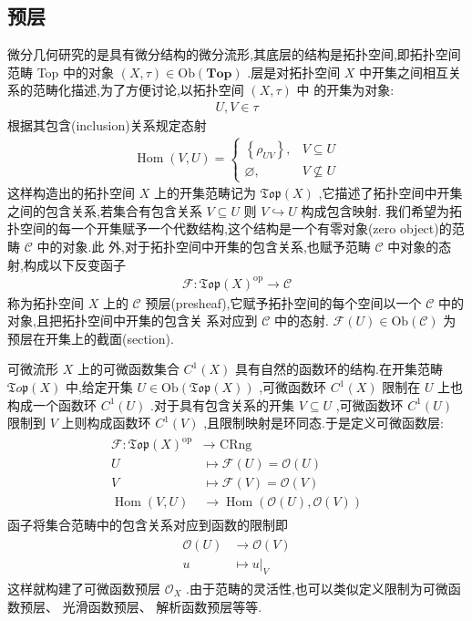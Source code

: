 \subsection{预层}
微分几何研究的是具有微分结构的微分流形,其底层的结构是拓扑空间,即拓扑空间范畴 Top 中的对象 $(X, \tau) \in \mathrm{Ob}(\mathbf{T o p})$ .层是对拓扑空间 $X$ 中开集之间相互关系的范畴化描述,为了方便讨论,以拓扑空间 $(X, \tau)$ 中 的开集为对象:
\begin{align*}
U, V \in \tau
\end{align*}
根据其包含(inclusion)关系规定态射
\begin{align*}
\operatorname{Hom}(V, U)= \begin{cases}\left\{\rho_{U V}\right\}, & V \subseteq U \\ \varnothing, & V \nsubseteq U\end{cases}
\end{align*}
这样构造出的拓扑空间 $X$ 上的开集范畴记为 $\mathfrak{T} \mathfrak{o p}(X)$ ,它描述了拓扑空间中开集之间的包含关系,若集合有包含关系 $V \subseteq U$ 则 $V \hookrightarrow U$ 构成包含映射.
我们希望为拓扑空间的每一个开集赋予一个代数结构,这个结构是一个有零对象(zero object)的范畴 $\mathcal{C}$ 中的对象.此 外,对于拓扑空间中开集的包含关系,也赋予范畴 $\mathcal{C}$ 中对象的态射,构成以下反变函子
\begin{align*}
\mathscr{F}: \mathfrak{T o p}(X)^{\mathrm{op}} \rightarrow \mathcal{C}
\end{align*}
称为拓扑空间 $X$ 上的 $\mathcal{C}$ 预层(presheaf),它赋予拓扑空间的每个空间以一个 $\mathcal{C}$ 中的对象,且把拓扑空间中开集的包含关 系对应到 $\mathcal{C}$ 中的态射. $\mathscr{F}(U) \in \mathrm{Ob}(\mathcal{C})$ 为预层在开集上的截面(section).

可微流形 $X$ 上的可微函数集合 $C^1(X)$ 具有自然的函数环的结构.在开集范畴 $\mathfrak{T} o \mathfrak{p}(X)$ 中,给定开集 $U \in \mathrm{Ob}(\mathfrak{T o p}(X))$ ,可微函数环 $C^1(X)$ 限制在 $U$ 上也构成一个函数环 $C^1(U)$ .对于具有包含关系的开集 $V \subseteq U$ ,可微函数环 $C^1(U)$ 限制到 $V$ 上则构成函数环 $C^1(V)$ ,且限制映射是环同态.于是定义可微函数层:
\begin{align*}
\begin{aligned}
\mathscr{F}: \mathfrak{T o p}(X)^{\mathrm{op}} & \rightarrow \text { CRng } \\
U & \mapsto \mathscr{F}(U)=\mathcal{O}(U) \\
V & \mapsto \mathscr{F}(V)=\mathcal{O}(V) \\
\operatorname{Hom}(V, U) & \rightarrow \operatorname{Hom}(\mathcal{O}(U), \mathcal{O}(V))
\end{aligned}
\end{align*}
函子将集合范畴中的包含关系对应到函数的限制即
\begin{align*}
\begin{aligned}
\mathcal{O}(U) & \rightarrow \mathcal{O}(V) \\
u & \left.\mapsto u\right|_V
\end{aligned}
\end{align*}
这样就构建了可微函数预层 $\mathcal{O}_X$ .由于范畴的灵活性,也可以类似定义限制为可微函数预层、 光滑函数预层、 解析函数预层等等.

